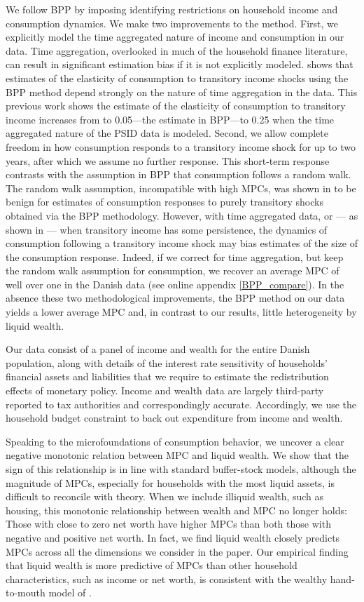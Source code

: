 \documentclass[titlepage]{\econtex}\newcommand{\texname}{ConsumptionHeterogeneity}
\begin{document}
	We follow BPP by imposing identifying restrictions on household income and consumption dynamics. We make two improvements to the method. First, we explicitly model the time aggregated nature of income and consumption in our data. Time aggregation, overlooked in much of the household finance literature, can result in significant estimation bias if it is not explicitly modeled. \cite{crawley_time_2020} shows that estimates of the elasticity of consumption to transitory income shocks using the BPP method depend strongly on the nature of time aggregation in the data. This previous work shows the estimate of the elasticity of consumption to transitory income increases from to 0.05---the estimate in BPP---to 0.25 when the time aggregated nature of the PSID data is modeled. Second, we allow complete freedom in how consumption responds to a transitory income shock for up to two years, after which we assume no further response. This short-term response contrasts with the assumption in BPP that consumption follows a random walk. The random walk assumption, incompatible with high MPCs, was shown in \cite{kaplan_how_2010} to be benign for estimates of consumption responses to purely transitory shocks obtained via the BPP methodology. However, with time aggregated data, or --- as shown in \cite{commault_how_2017} --- when transitory income has some persistence, the dynamics of consumption following a transitory income shock may bias estimates of the size of the consumption response. Indeed, if we correct for time aggregation, but keep the random walk assumption for consumption, we recover an average MPC of well over one in the Danish data (see online appendix \ref{BPP_compare}). In the absence these two methodological improvements, the BPP method on our data yields a lower average MPC and, in contrast to our results, little heterogeneity by liquid wealth.
	
	Our data consist of a panel of income and wealth for the entire Danish population, along with details of the interest rate sensitivity of households' financial assets and liabilities that we require to estimate the redistribution effects of monetary policy. Income and wealth data are largely third-party reported to tax authorities and correspondingly accurate. Accordingly, we use the household budget constraint to back out expenditure from income and wealth.
	
	Speaking to the microfoundations of consumption behavior, we uncover a clear negative monotonic relation between MPC and liquid wealth. We show that the sign of this relationship is in line with standard buffer-stock models, although the magnitude of MPCs, especially for households with the most liquid assets, is difficult to reconcile with theory. When we include illiquid wealth, such as housing, this monotonic relationship between wealth and MPC no longer holds: Those with close to zero net worth have higher MPCs than both those with negative and positive net worth. In fact, we find liquid wealth closely predicts MPCs across all the dimensions we consider in the paper. Our empirical finding that liquid wealth is more predictive of MPCs than other household characteristics, such as income or net worth, is consistent with the wealthy hand-to-mouth model of \cite{violante_wealthy_2014}.
	
\end{document}
